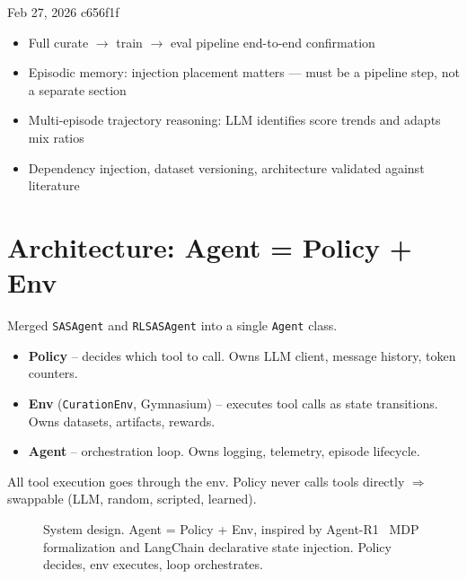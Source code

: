 \meetingheader
    {Feb 27, 2026}
    {c656f1f}
    {}
    {\begin{itemize}
        \item Full curate $\to$ train $\to$ eval pipeline end-to-end confirmation
        \item Episodic memory: injection placement matters --- must be a pipeline step, not a separate section
        \item Multi-episode trajectory reasoning: LLM identifies score trends and adapts mix ratios
        \item Dependency injection, dataset versioning, architecture validated against literature
    \end{itemize}}
    {}




\newpage
\section{Architecture: Agent = Policy + Env}

Merged \texttt{SASAgent} and \texttt{RLSASAgent} into a single \texttt{Agent} class.

\begin{itemize}
    \item \textbf{Policy} -- decides which tool to call. Owns LLM client, message history, token counters.
    \item \textbf{Env} (\texttt{CurationEnv}, Gymnasium) -- executes tool calls as state transitions. Owns datasets, artifacts, rewards.
    \item \textbf{Agent} -- orchestration loop. Owns logging, telemetry, episode lifecycle.
\end{itemize}

\noindent All tool execution goes through the env. Policy never calls tools directly $\Rightarrow$ swappable (LLM, random, scripted, learned).

\begin{figure}[H]
\centering
\caption{System design. Agent = Policy + Env, inspired by Agent-R1~\cite{chengAgentR1TrainingPowerful2025} MDP formalization
and LangChain declarative state injection. Policy decides, env executes, loop orchestrates.}
\label{fig:architecture}
\end{figure}


